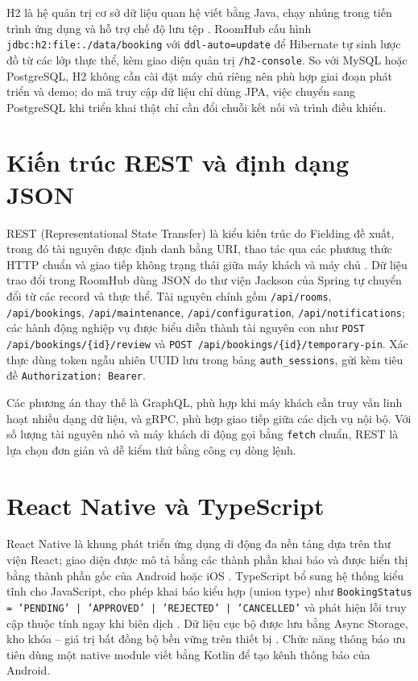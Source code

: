 \documentclass[../DoAn.tex]{subfiles}
\begin{document}
H2 là hệ quản trị cơ sở dữ liệu quan hệ viết bằng Java, chạy nhúng trong tiến trình ứng dụng và hỗ trợ chế độ lưu tệp \cite{h2database}. RoomHub cấu hình \texttt{jdbc:h2:file:./data/booking} với \texttt{ddl-auto=update} để Hibernate tự sinh lược đồ từ các lớp thực thể, kèm giao diện quản trị \texttt{/h2-console}. So với MySQL hoặc PostgreSQL, H2 không cần cài đặt máy chủ riêng nên phù hợp giai đoạn phát triển và demo; do mã truy cập dữ liệu chỉ dùng JPA, việc chuyển sang PostgreSQL khi triển khai thật chỉ cần đổi chuỗi kết nối và trình điều khiển.

\section{Kiến trúc REST và định dạng JSON}
\label{section:3.4}
REST (Representational State Transfer) là kiểu kiến trúc do Fielding đề xuất, trong đó tài nguyên được định danh bằng URI, thao tác qua các phương thức HTTP chuẩn và giao tiếp không trạng thái giữa máy khách và máy chủ \cite{fielding2000rest}. Dữ liệu trao đổi trong RoomHub dùng JSON do thư viện Jackson của Spring tự chuyển đổi từ các record và thực thể. Tài nguyên chính gồm \texttt{/api/rooms}, \texttt{/api/bookings}, \texttt{/api/maintenance}, \texttt{/api/configuration}, \texttt{/api/notifications}; các hành động nghiệp vụ được biểu diễn thành tài nguyên con như \texttt{POST /api/bookings/\{id\}/review} và \texttt{POST /api/bookings/\{id\}/temporary-pin}. Xác thực dùng token ngẫu nhiên UUID lưu trong bảng \texttt{auth\_sessions}, gửi kèm tiêu đề \texttt{Authorization: Bearer}.

Các phương án thay thế là GraphQL, phù hợp khi máy khách cần truy vấn linh hoạt nhiều dạng dữ liệu, và gRPC, phù hợp giao tiếp giữa các dịch vụ nội bộ. Với số lượng tài nguyên nhỏ và máy khách di động gọi bằng \texttt{fetch} chuẩn, REST là lựa chọn đơn giản và dễ kiểm thử bằng công cụ dòng lệnh.

\section{React Native và TypeScript}
\label{section:3.5}
React Native là khung phát triển ứng dụng di động đa nền tảng dựa trên thư viện React; giao diện được mô tả bằng các thành phần khai báo và được hiển thị bằng thành phần gốc của Android hoặc iOS \cite{reactnative}. TypeScript bổ sung hệ thống kiểu tĩnh cho JavaScript, cho phép khai báo kiểu hợp (union type) như \texttt{BookingStatus = 'PENDING' | 'APPROVED' | 'REJECTED' | 'CANCELLED'} và phát hiện lỗi truy cập thuộc tính ngay khi biên dịch \cite{typescript}. Dữ liệu cục bộ được lưu bằng Async Storage, kho khóa -- giá trị bất đồng bộ bền vững trên thiết bị \cite{asyncstorage}. Chức năng thông báo ưu tiên dùng một native module viết bằng Kotlin để tạo kênh thông báo của Android.
\end{document}
